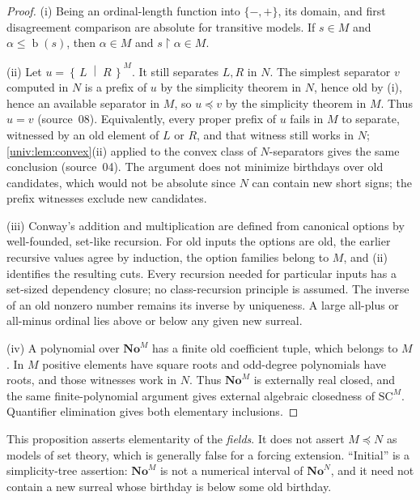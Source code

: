 \documentclass[11pt,letterpaper]{article}
\numberwithin{equation}{section}
\theoremstyle{definition}
\theoremstyle{remark}
\newcommand{\No}{\mathbf{No}}
\newcommand{\SC}{\mathrm{SC}}
\newcommand{\NoM}{\No^{M}}
\newcommand{\NoN}{\No^{N}}
\newcommand{\SCM}{\SC^{M}}
\newcommand{\bd}{\operatorname{b}}
\newcommand{\res}{\mathbin{\upharpoonright}}
\newcommand{\cut}[2]{\left\{\,#1\;\middle|\;#2\,\right\}}
\begin{document}
\begin{proof}
(i) Being an ordinal-length function into $\{-,+\}$, its domain, and first
disagreement comparison are absolute for transitive models. If $s\in M$ and
$\alpha\leq\bd(s)$, then $\alpha\in M$ and $s\res\alpha\in M$.

(ii) Let $u=\cut LR^M$. It still separates $L,R$ in $N$. The simplest
separator $v$ computed in $N$ is a prefix of $u$ by the simplicity theorem in
$N$, hence old by (i), hence an available separator in $M$, so $u\preceq v$ by
the simplicity theorem in $M$. Thus $u=v$ (source~08). Equivalently, every
proper prefix of $u$ fails in $M$ to separate, witnessed by an old element of
$L$ or $R$, and that witness still works in $N$; \cref{univ:lem:convex}(ii)
applied to the convex class of $N$-separators gives the same conclusion
(source~04). The argument does not minimize birthdays over old candidates,
which would not be absolute since $N$ can contain new short signs; the prefix
witnesses exclude new candidates.

(iii) Conway's addition and multiplication are defined from canonical options
by well-founded, set-like recursion. For old inputs the options are old, the
earlier recursive values agree by induction, the option families belong to
$M$, and (ii) identifies the resulting cuts. Every recursion needed for
particular inputs has a set-sized dependency closure; no class-recursion
principle is assumed. The inverse of an old nonzero number remains its inverse
by uniqueness. A large all-plus or all-minus ordinal lies above or below any
given new surreal.

(iv) A polynomial over $\NoM$ has a finite old coefficient tuple, which
belongs to $M$. In $M$ positive elements have square roots and odd-degree
polynomials have roots, and those witnesses work in $N$. Thus $\NoM$ is
externally real closed, and the same finite-polynomial argument gives external
algebraic closedness of $\SCM$. Quantifier elimination gives both elementary
inclusions.
\end{proof}

This proposition asserts elementarity of the \emph{fields}. It does not
assert $M\preccurlyeq N$ as models of set theory, which is generally false for
a forcing extension. ``Initial'' is a simplicity-tree assertion: $\NoM$ is not
a numerical interval of $\NoN$, and it need not contain a new surreal whose
birthday is below some old birthday.
\end{document}
